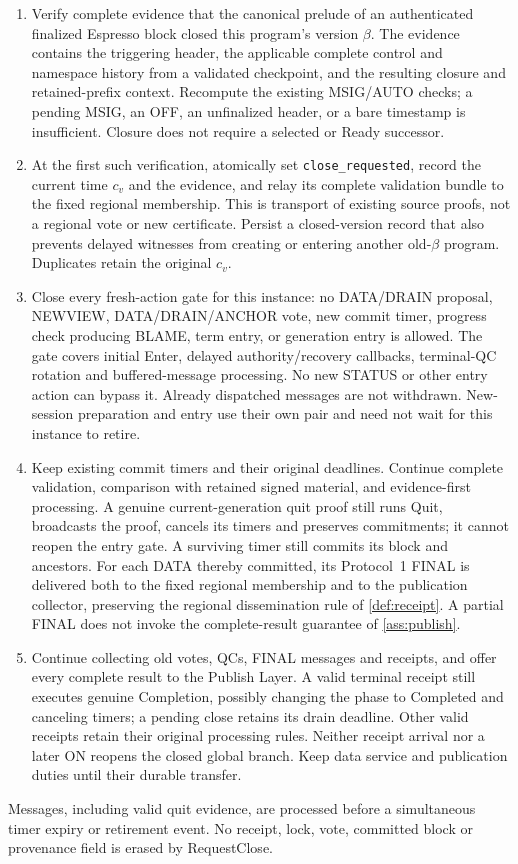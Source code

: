 \begin{enumerate}[label=(\roman*),itemsep=2pt]
\item Verify complete evidence that the canonical prelude of an
authenticated finalized Espresso block closed this program's version
$\beta$. The evidence contains the triggering header, the applicable
complete control and namespace history from a validated checkpoint,
and the resulting closure and retained-prefix context. Recompute the
existing MSIG/AUTO checks; a pending MSIG, an OFF, an unfinalized header,
or a bare timestamp is insufficient. Closure does not require a selected
or Ready successor.
\item At the first such verification, atomically set
\texttt{close\_requested}, record the current time $c_v$ and the evidence,
and relay its complete validation bundle to the fixed regional membership.
This is transport of existing source proofs, not a regional vote or new
certificate. Persist a closed-version record that also prevents delayed
witnesses from creating or entering another old-$\beta$ program.
Duplicates retain the original $c_v$.
\item Close every fresh-action gate for this instance: no DATA/DRAIN
proposal, NEWVIEW, DATA/DRAIN/ANCHOR vote, new commit timer, progress
check producing BLAME, term entry, or generation entry is allowed.
The gate covers initial Enter, delayed authority/recovery callbacks,
terminal-QC rotation and buffered-message processing. No new STATUS
or other entry action can bypass it. Already dispatched messages are
not withdrawn. New-session preparation and entry use their own pair
and need not wait for this instance to retire.
\item Keep existing commit timers and their original deadlines.
Continue complete validation, comparison with retained signed material,
and evidence-first processing. A genuine current-generation quit proof
still runs Quit, broadcasts the proof, cancels its timers and preserves
commitments; it cannot reopen the entry gate. A surviving timer still
commits its block and ancestors. For each DATA thereby committed, its
Protocol~1 FINAL is delivered both to the fixed regional membership and
to the publication collector, preserving the regional dissemination rule
of \cref{def:receipt}. A partial FINAL does not invoke the complete-result
guarantee of \cref{ass:publish}.
\item Continue collecting old votes, QCs, FINAL messages and receipts,
and offer every complete result to the Publish Layer. A valid terminal
receipt still executes genuine Completion, possibly changing the phase
to Completed and canceling timers; a pending close retains its drain
deadline. Other valid receipts retain their original processing rules.
Neither receipt arrival nor a later ON reopens the closed global branch.
Keep data service and publication duties until their durable transfer.
\end{enumerate}
Messages, including valid quit evidence, are processed before a
simultaneous timer expiry or retirement event. No receipt, lock, vote,
committed block or provenance field is erased by RequestClose.

